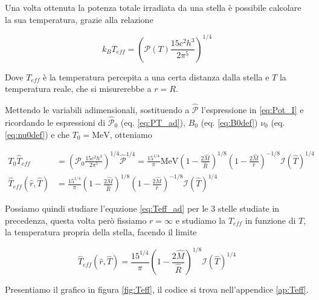 \documentclass[a4paper, titlepage]{article}
\begin{document}
Una volta ottenuta la potenza totale irradiata da una stella è possibile calcolare la sua temperatura, grazie alla relazione

\begin{equation}
    k_B T_{eff} = \left( \mathcal{P} (T) \frac{15 c^2 h^3}{2 \pi^5} \right)^{1/4}
    \label{eq:Teff}
\end{equation}

Dove $T_{eff}$ è la temperatura percepita a una certa distanza dalla stella e $T$ la temperatura reale, che si misurerebbe a $r = R$.

Mettendo le variabili adimensionali, sostituendo a $\mathcal{\hat P}$ l'espressione in \ref{eq:Pot_I} e ricordando le espressioni di $\mathcal{\hat P}_0$ (eq. \ref{eq:PT_ad}), $B_0$ (eq. \ref{eq:B0def}) $\nu_0$ (eq. \ref{eq:nu0def}) e che $T_0 = \unit{\mega\electronvolt}$, otteniamo

\begin{align}
    T_0 \hat T_{eff} &= \left( \mathcal P_0 \frac{15 c^2 h^3}{2 \pi^5} \right)^{1/4} \mathcal{\hat P}^{1/4}
    = \frac{15^{1/4}}{\pi} \unit{\mega\electronvolt} \left(1 - \frac{2 \hat M}{\hat R} \right)^{1/8} \left(1 - \frac{2 \hat M}{\hat r} \right)^{-1/8} \mathcal{I} (\hat T)^{1/4} \\
    \hat T_{eff}(\hat r, \hat T) &= \frac{15^{1/4}}{\pi} \left(1 - \frac{2 \hat M}{\hat R} \right)^{1/8} \left(1 - \frac{2 \hat M}{\hat r} \right)^{-1/8} \mathcal{I} (\hat T)^{1/4}
    \label{eq:Teff_ad}
\end{align}

Possiamo quindi studiare l'equzione \ref{eq:Teff_ad} per le 3 stelle studiate in precedenza, questa volta però fissiamo $r = \infty$ e studiamo la $T_{eff}$ in funzione di $T$, la temperatura propria della stella, facendo il limite

\begin{equation}
    \hat T_{eff}(\hat r, \hat T) = \frac{15^{1/4}}{\pi} \left(1 - \frac{2 \hat M}{\hat R} \right)^{1/8} \mathcal{I} (\hat T)^{1/4}
\end{equation}

Presentiamo il grafico in figura \ref{fig:Teff}, il codice si trova nell'appendice \ref{ap:Teff}.
\end{document}
